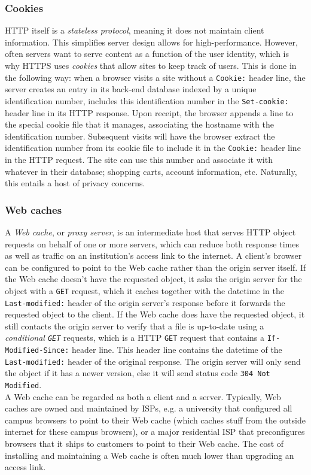 \documentclass[table, xcdraw]{article}%
\begin{document}
\subsubsection{Cookies}

HTTP itself is a \emph{stateless protocol}, meaning it does not maintain client information. This simplifies server design allows for high-performance. However, often servers want to serve content as a function of the user identity, which is why HTTPS uses \emph{cookies} that allow sites to keep track of users. This is done in the following way: when a browser visits a site without a \texttt{Cookie:} header line, the server creates an entry in its back-end database indexed by a unique identification number, includes this identification number in the \texttt{Set-cookie:} header line in its HTTP response. Upon receipt, the browser appends a line to the special cookie file that it manages, associating the hostname with the  identification number. Subsequent visits will have the browser extract the identification number from its cookie file to include it in the \texttt{Cookie:} header line in the HTTP request. The site can use this number and associate it with whatever in their database; shopping carts, account information, etc. Naturally, this entails a host of privacy concerns.

\subsubsection{Web caches}

A \emph{Web cache}, or \emph{proxy server}, is an intermediate host that serves HTTP object requests on behalf of one or more servers, which can reduce both response times as well as traffic on an institution's access link to the internet. A client's browser can be configured to point to the Web cache rather than the origin server itself. If the Web cache doesn't have the requested object, it asks the origin server for the object with a \texttt{GET} request, which it caches together with the datetime in the \texttt{Last-modified:} header of the origin server's response before it forwards the requested object to the client. If the Web cache does have the requested object, it still contacts the origin server to verify that a file is up-to-date using a \emph{conditional \texttt{GET}} requests, which is a HTTP \texttt{GET} request that contains a \texttt{If-Modified-Since:} header line. This header line contains the datetime of the \texttt{Last-modified:} header of the original response. The origin server will only send the object if it has a newer version, else it will send status code \texttt{304 Not Modified}.\\
A Web cache can be regarded as both a client and a server. Typically, Web caches are owned and maintained by ISPs, e.g. a university that configured all campus browsers to point to their Web cache (which caches stuff from the outside internet for these campus browsers), or a major residential ISP that preconfigures browsers that it ships to customers to point to their Web cache. The cost of installing and maintaining a Web cache is often much lower than upgrading an access link.
\end{document}
